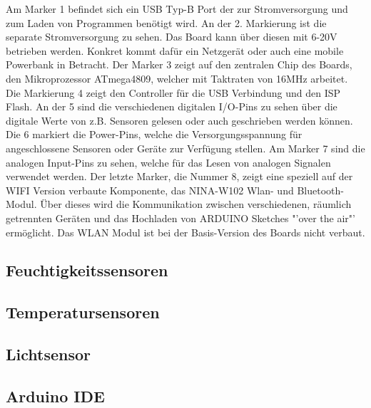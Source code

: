 \documentclass[
    load-dhbw-templates,
    load-preamble = true,
    auto-intro-pages = all,
    add-tocs-to-toc,
    debug = true,
    language = english,
    mainlanguage = ngerman,
    add-bibliography,
    bib-file = dhbw-source.bib,
    biblatex/style = alphabetic, 
]{iodhbwm}
\begin{document}
            
        Am Marker 1 befindet sich ein USB Typ-B Port der zur Stromversorgung und zum Laden von Programmen benötigt wird.
        An der 2. Markierung ist die separate Stromversorgung zu sehen. Das Board kann über diesen mit 6-20V betrieben werden. Konkret kommt dafür ein Netzgerät oder auch eine mobile Powerbank in Betracht.
        Der Marker 3 zeigt auf den zentralen Chip des Boards, den Mikroprozessor ATmega4809, welcher mit Taktraten von 16MHz arbeitet.
        Die Markierung 4 zeigt den Controller für die USB Verbindung und den ISP Flash.
        An der 5 sind die verschiedenen digitalen I/O-Pins zu sehen über die digitale Werte von z.B. Sensoren gelesen oder auch geschrieben werden können.
        Die 6 markiert die Power-Pins, welche die Versorgungsspannung für angeschlossene Sensoren oder Geräte zur Verfügung stellen.
        Am Marker 7 sind die analogen Input-Pins zu sehen, welche für das Lesen von analogen Signalen verwendet werden.
        Der letzte Marker, die Nummer 8, zeigt eine speziell auf der WIFI Version verbaute Komponente, das NINA-W102 Wlan- und Bluetooth-Modul. Über dieses wird die Kommunikation zwischen verschiedenen, räumlich getrennten Geräten und das Hochladen von ARDUINO Sketches "'over the air"' ermöglicht.
        Das WLAN Modul ist bei der Basis-Version des Boards nicht verbaut.

        \subsection{Feuchtigkeitssensoren}



        
        \subsection{Temperatursensoren}
        \subsection{Lichtsensor}
        \subsection{Arduino IDE}
\end{document}
